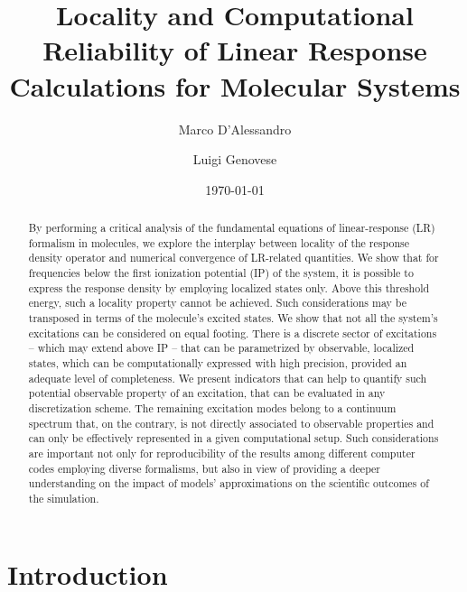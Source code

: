 \documentclass[reprint,aps,prb]{revtex4-1}
\begin{document}

\title{Locality and Computational Reliability of Linear Response Calculations for Molecular Systems}
\author{Marco D'Alessandro}
\author{Luigi Genovese}
\date{\today}

\begin{abstract}
By performing a critical analysis of the fundamental equations of linear-response (LR) formalism in molecules,
we explore the interplay between locality of the response density operator and  numerical convergence of LR-related quantities.
We show that for frequencies below the first ionization potential (IP) of the system, it is possible to express the response density by employing localized states only.
Above this threshold energy, such a locality property cannot be achieved.
Such considerations may be transposed in terms of the molecule's excited states. We show that not all the system's excitations can be considered on equal footing.
There is a discrete sector of excitations -- which may extend above IP -- that can be parametrized by observable, localized states, which can be computationally expressed with high precision, provided an adequate level of completeness.
We present indicators that can help to quantify such potential observable property of an excitation, that can be evaluated
in any discretization scheme.
The remaining excitation modes belong to a continuum spectrum that, on the contrary, is not directly associated to observable properties and can only be effectively represented in a given computational setup.
Such considerations are important not only for reproducibility of the results among different computer codes
employing diverse formalisms, but also in view of providing a deeper understanding on the impact of models'
approximations on the scientific outcomes of the simulation.
\end{abstract}

\maketitle

\section{Introduction}
\end{document}
